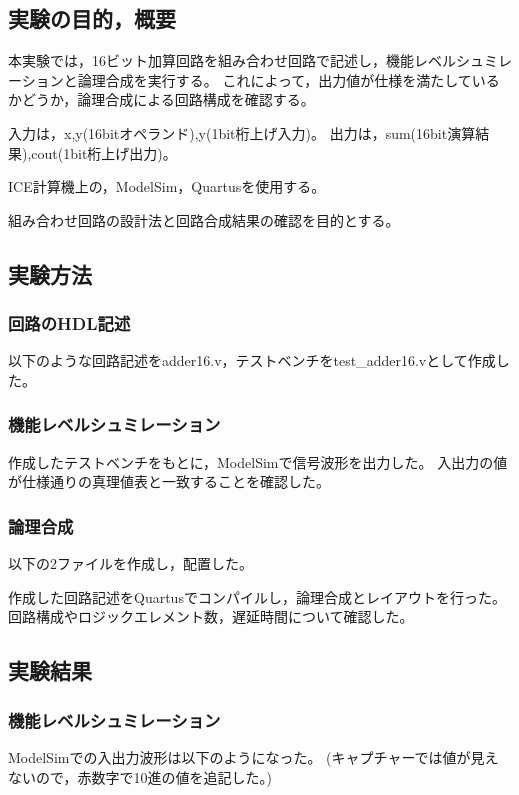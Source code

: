 
\subsection{実験の目的，概要}
本実験では，16ビット加算回路を組み合わせ回路で記述し，機能レベルシュミレーションと論理合成を実行する。
これによって，出力値が仕様を満たしているかどうか，論理合成による回路構成を確認する。

入力は，x,y(16bitオペランド),y(1bit桁上げ入力)。
出力は，sum(16bit演算結果),cout(1bit桁上げ出力)。

ICE計算機上の，ModelSim，Quartusを使用する。

組み合わせ回路の設計法と回路合成結果の確認を目的とする。

\subsection{実験方法}
\subsubsection{回路のHDL記述}
以下のような回路記述をadder16.v，テストベンチをtest\_adder16.vとして作成した。



\subsubsection{機能レベルシュミレーション}
作成したテストベンチをもとに，ModelSimで信号波形を出力した。
入出力の値が仕様通りの真理値表と一致することを確認した。

\subsubsection{論理合成}
以下の2ファイルを作成し，配置した。



作成した回路記述をQuartusでコンパイルし，論理合成とレイアウトを行った。
回路構成やロジックエレメント数，遅延時間について確認した。
 
\subsection{実験結果}
\subsubsection{機能レベルシュミレーション}
ModelSimでの入出力波形は以下のようになった。
(キャプチャーでは値が見えないので，赤数字で10進の値を追記した。)

